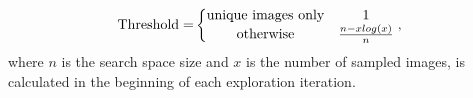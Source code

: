 \begin{equation}
\label{eq:method:threshold}
\begin{split}
\textnormal{Threshold} = & \left\{
	\begin{matrix}
	\textnormal{unique images only}& 1\\
	\textnormal{otherwise} & \tfrac{n - xlog(x)}{n}
	\end{matrix}
\right . ,\\
\end{split}
\end{equation}
where $n$ is the search space size and $x$ is the number of sampled images, is calculated in the beginning of each exploration iteration.

